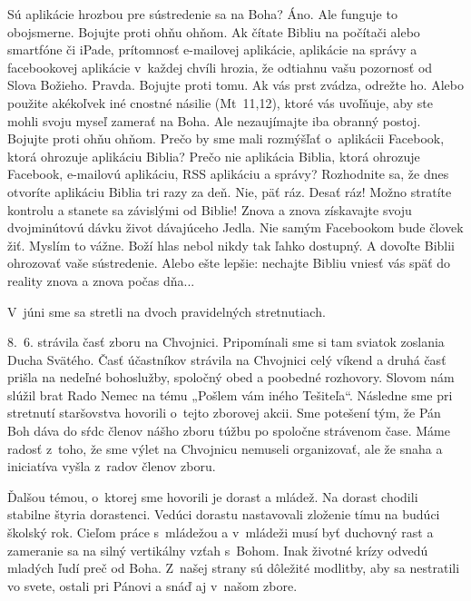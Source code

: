 \def\velkostpisma{9}
\def\velkostriadku{12}



Sú aplikácie hrozbou pre sústredenie sa na Boha? Áno. Ale funguje to obojsmerne. Bojujte proti ohňu ohňom. Ak čítate Bibliu na počítači alebo smartfóne či iPade, prítomnosť e-mailovej aplikácie, aplikácie na správy a facebookovej aplikácie v~každej chvíli hrozia, že odtiahnu vašu pozornosť od Slova Božieho. Pravda. Bojujte proti tomu. Ak vás prst zvádza, odrežte ho. Alebo použite akékoľvek iné cnostné násilie (Mt~11,12), ktoré vás uvoľňuje, aby ste mohli svoju myseľ zamerať na Boha. Ale nezaujímajte iba obranný postoj. Bojujte proti ohňu ohňom.
Prečo by sme mali rozmýšľať o~aplikácii Facebook, ktorá ohrozuje aplikáciu Biblia? Prečo nie aplikácia Biblia, ktorá ohrozuje Facebook, e-mailovú aplikáciu, RSS aplikáciu a správy?
Rozhodnite sa, že dnes otvoríte aplikáciu Biblia tri razy za deň. Nie, päť ráz. Desať ráz! Možno stratíte kontrolu a stanete sa závislými od Biblie!
Znova a znova získavajte svoju dvojminútovú dávku život dávajúceho Jedla. Nie samým Facebookom bude človek žiť. Myslím to vážne. Boží hlas nebol nikdy tak ľahko dostupný. A dovoľte Biblii ohrozovať vaše sústredenie. Alebo ešte lepšie: nechajte Bibliu vniesť vás späť do reality znova a znova počas dňa...




V~júni sme sa stretli na dvoch pravidelných stretnutiach.

8.~6. strávila časť zboru na Chvojnici. Pripomínali sme si tam sviatok zoslania Ducha Svätého. Časť účastníkov strávila na Chvojnici celý víkend a druhá časť prišla na nedeľné bohoslužby, spoločný obed a poobedné rozhovory. Slovom nám slúžil brat Rado Nemec na tému „Pošlem vám iného Tešiteľa“. Následne sme pri stretnutí staršovstva hovorili o~tejto zborovej akcii. Sme potešení tým, že Pán Boh dáva do sŕdc členov nášho zboru túžbu po spoločne strávenom čase. Máme radosť z~toho, že sme výlet na Chvojnicu nemuseli organizovať, ale že snaha a iniciatíva vyšla z~radov členov zboru.

Ďalšou témou, o~ktorej sme hovorili je dorast a mládež. Na dorast chodili stabilne štyria dorastenci. Vedúci dorastu nastavovali zloženie tímu na budúci školský rok. Cieľom práce s~mládežou a v~mládeži musí byť duchovný rast a zameranie sa na silný vertikálny vzťah s~Bohom. Inak životné krízy odvedú mladých ľudí preč od Boha. Z~našej strany sú dôležité modlitby, aby sa nestratili vo svete, ostali pri Pánovi a snáď aj v~našom zbore.

